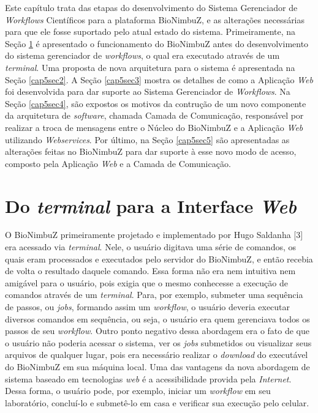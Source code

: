 Este capítulo trata das etapas do desenvolvimento do Sistema Gerenciador de \textit{Workflows} Científicos para a plataforma BioNimbuZ, e as alterações necessárias para que ele fosse suportado pelo atual estado do sistema. Primeiramente, na Seção \ref{cap5sec1} é apresentado o funcionamento do BioNimbuZ antes do desenvolvimento do sistema gerenciador de \textit{workflows}, o qual era executado através de um \textit{terminal}. Uma proposta de nova arquitetura para o sistema é apresentada na Seção \ref{cap5sec2}. A Seção \ref{cap5sec3} mostra os detalhes de como a Aplicação \textit{Web} foi desenvolvida para dar suporte ao Sistema Gerenciador de \textit{Workflows}. Na Seção \ref{cap5sec4}, são expostos os motivos da contrução de um novo componente da arquitetura de \textit{software}, chamada Camada de Comunicação, responsável por realizar a troca de mensagens entre o Núcleo do BioNimbuZ e a Aplicação \textit{Web} utilizando \textit{Webservices}. Por último, na Seção \ref{cap5sec5} são apresentadas as alterações feitas no BioNimbuZ para dar suporte à esse novo modo de acesso, composto pela Aplicação \textit{Web} e a Camada de Comunicação.

\section{Do \textit{terminal} para a Interface \textit{Web}} \label{cap5sec1}

O BioNimbuZ primeiramente projetado e implementado por Hugo Saldanha [3] era acessado via \textit{terminal}. Nele, o usuário digitava uma série de comandos, os quais eram processados e executados pelo servidor do BioNimbuZ, e então recebia de volta o resultado daquele comando. Essa forma não era nem intuitiva nem amigável para o usuário, pois exigia que o mesmo conhecesse a execução de comandos através de um \textit{terminal}. Para, por exemplo, submeter uma sequência de passos, ou \textit{jobs}, formando assim um \textit{workflow}, o usuário deveria executar diversos comandos em sequência, ou seja, o usuário era quem gerenciava todos os passos de seu \textit{workflow}. Outro ponto negativo dessa abordagem era o fato de que o usuário não poderia acessar o sistema, ver os \textit{jobs} submetidos ou visualizar seus arquivos de qualquer lugar, pois era necessário realizar o \textit{download} do executável do BioNimbuZ em sua máquina local. Uma das vantagens da nova abordagem de sistema baseado em tecnologias \textit{web} é a acessibilidade provida pela \textit{Internet}. Dessa forma, o usuário pode, por exemplo, iniciar um \textit{workflow} em seu laboratório, concluí-lo e submetê-lo em casa e verificar sua execução pelo celular. 

